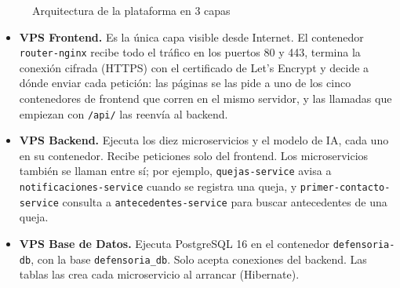 \begin{figure}[H]
{}
\caption{Arquitectura de la plataforma en 3 capas}\label{fig:arquitectura-3-capas}
\end{figure}

\begin{itemize}
  \item \textbf{VPS Frontend.} Es la única capa visible desde Internet. El contenedor \texttt{router-nginx} recibe todo el tráfico en los puertos 80 y 443, termina la conexión cifrada (HTTPS) con el certificado de Let's Encrypt y decide a dónde enviar cada petición: las páginas se las pide a uno de los cinco contenedores de frontend que corren en el mismo servidor, y las llamadas que empiezan con \texttt{/api/} las reenvía al backend.
  \item \textbf{VPS Backend.} Ejecuta los diez microservicios y el modelo de IA, cada uno en su contenedor. Recibe peticiones solo del frontend. Los microservicios también se llaman entre sí; por ejemplo, \texttt{quejas-service} avisa a \texttt{notificaciones-service} cuando se registra una queja, y \texttt{primer-contacto-service} consulta a \texttt{antecedentes-service} para buscar antecedentes de una queja.
  \item \textbf{VPS Base de Datos.} Ejecuta PostgreSQL 16 en el contenedor \texttt{defensoria-db}, con la base \texttt{defensoria\_db}. Solo acepta conexiones del backend. Las tablas las crea cada microservicio al arrancar (Hibernate).
\end{itemize}

